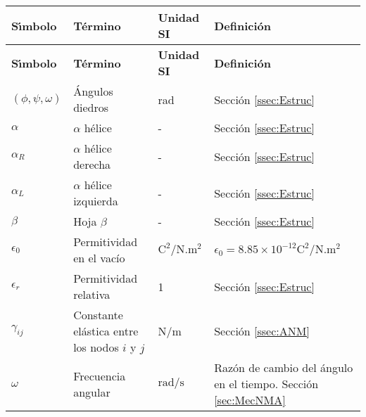 \begin{longtable}{p{2cm}p{3.5cm}p{2cm}p{8cm}}
\textbf{S\'{\i}mbolo}&\textbf{T\'{e}rmino}&\textbf{Unidad SI}&\textbf{Definici\'{o}n}\\[0.5ex] \hline%
\endfirsthead%
\textbf{S\'{\i}mbolo}&\textbf{T\'{e}rmino}&\textbf{Unidad SI}&\textbf{Definici\'{o}n}\\[0.5ex] \hline%
\endhead%
\renewcommand{\arraystretch}{1.3}
 \label{simbolosg}
 $(\phi,\psi,\omega)$&\'{A}ngulos diedros&\hspace{6pt}rad &Secci\'{o}n \ref{ssec:Estruc} \\
 $\alpha$ &$\alpha$ h\'{e}lice&\hspace{6pt}- &Secci\'{o}n \ref{ssec:Estruc}\\
     $\alpha_R$&$\alpha$ h\'{e}lice derecha&\hspace{6pt}- &Secci\'{o}n \ref{ssec:Estruc}\\
     $\alpha_L$&$\alpha$ h\'{e}lice izquierda&\hspace{6pt}- &Secci\'{o}n \ref{ssec:Estruc} \\
  $\beta$&Hoja $\beta$&\hspace{6pt}- &Secci\'{o}n \ref{ssec:Estruc} \\
  $\epsilon_0$&Permitividad en el vac\'{i}o&\hspace{6pt}$\mathrm{C^2/N.m^2}$&$\epsilon_0=8.85\times 10^{-12}\mathrm{C^2/N.m^2}$ \\ 
   $\epsilon_r$&Permitividad relativa&\hspace{6pt}1&Secci\'{o}n \ref{ssec:Estruc} \\
   $\gamma_{ij}$&Constante el\'{a}stica entre los nodos $i$ y $j$&\hspace{6pt}N/m&Secci\'{o}n \ref{ssec:ANM} \\
   $\omega$&Frecuencia angular&\hspace{6pt}$\mathrm{rad/s}$&Raz\'{o}n de cambio del \'{a}ngulo en el tiempo. Secci\'{o}n \ref{sec:MecNMA}\\%
     \hline
\end{longtable}


